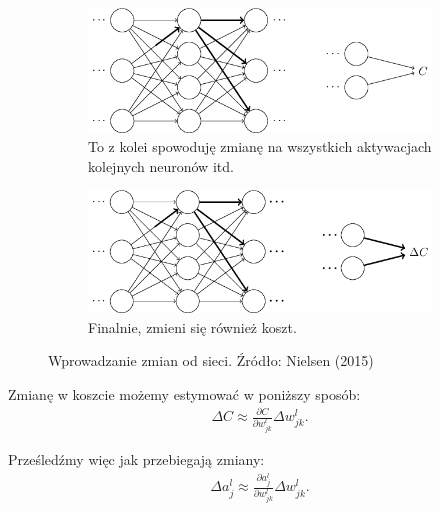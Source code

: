 \documentclass[10pt, oneside]{article}
\theoremstyle{remark}
\begin{document}
\begin{figure}[!htpb]
	\begin{subfigure}{.5\textwidth}
	  \centering
	  \includegraphics[width=.95\linewidth]{figures/tikz24}
	  \caption{To z kolei spowoduję zmianę na wszystkich aktywacjach kolejnych neuronów itd.}
	  \label{fig:sfig1}
	\end{subfigure}%
	\begin{subfigure}{.5\textwidth}
	  \centering
	  \includegraphics[width=.95\linewidth]{figures/tikz25}
	  \caption{Finalnie, zmieni się również koszt.}
	  \label{fig:sfig1}
	\end{subfigure}%
	\caption{Wprowadzanie zmian od sieci. Źródło: Nielsen (2015)}
\end{figure}
Zmianę w koszcie możemy estymować w poniższy sposób:
\begin{eqnarray} 
  \Delta C \approx \frac{\partial C}{\partial w^l_{jk}} \Delta w^l_{jk}.
\end{eqnarray}

Prześledźmy więc jak przebiegają zmiany:
\begin{eqnarray} 
  \Delta a^l_j \approx \frac{\partial a^l_j}{\partial w^l_{jk}} \Delta w^l_{jk}.
\end{eqnarray}
\end{document}
